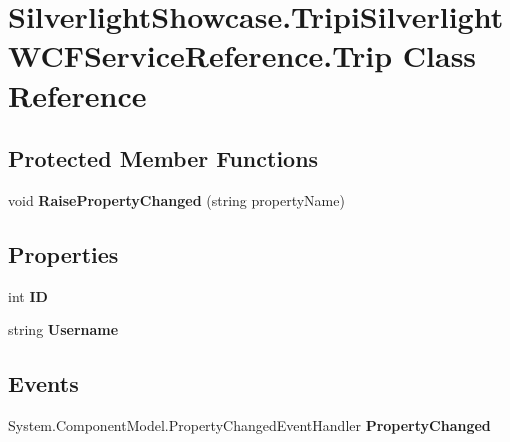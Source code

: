 \hypertarget{class_silverlight_showcase_1_1_tripi_silverlight_w_c_f_service_reference_1_1_trip}{
\section{SilverlightShowcase.TripiSilverlightWCFServiceReference.Trip Class Reference}
\label{class_silverlight_showcase_1_1_tripi_silverlight_w_c_f_service_reference_1_1_trip}
}
\subsection*{Protected Member Functions}
\begin{DoxyCompactItemize}
\item 
\hypertarget{class_silverlight_showcase_1_1_tripi_silverlight_w_c_f_service_reference_1_1_trip_a916b7ce9604594f9477e112b946a13f7}{
void {\bfseries RaisePropertyChanged} (string propertyName)}
\label{class_silverlight_showcase_1_1_tripi_silverlight_w_c_f_service_reference_1_1_trip_a916b7ce9604594f9477e112b946a13f7}

\end{DoxyCompactItemize}
\subsection*{Properties}
\begin{DoxyCompactItemize}
\item 
\hypertarget{class_silverlight_showcase_1_1_tripi_silverlight_w_c_f_service_reference_1_1_trip_ae34f63bd3e40339bb0017d982c310767}{
int {\bfseries ID}}
\label{class_silverlight_showcase_1_1_tripi_silverlight_w_c_f_service_reference_1_1_trip_ae34f63bd3e40339bb0017d982c310767}

\item 
\hypertarget{class_silverlight_showcase_1_1_tripi_silverlight_w_c_f_service_reference_1_1_trip_ac28dd1a44a1670e2be38a5cd9ecdfa8e}{
string {\bfseries Username}}
\label{class_silverlight_showcase_1_1_tripi_silverlight_w_c_f_service_reference_1_1_trip_ac28dd1a44a1670e2be38a5cd9ecdfa8e}

\end{DoxyCompactItemize}
\subsection*{Events}
\begin{DoxyCompactItemize}
\item 
\hypertarget{class_silverlight_showcase_1_1_tripi_silverlight_w_c_f_service_reference_1_1_trip_a043730c02256468b9cd338909e23710c}{
System.ComponentModel.PropertyChangedEventHandler {\bfseries PropertyChanged}}
\label{class_silverlight_showcase_1_1_tripi_silverlight_w_c_f_service_reference_1_1_trip_a043730c02256468b9cd338909e23710c}

\end{DoxyCompactItemize}


